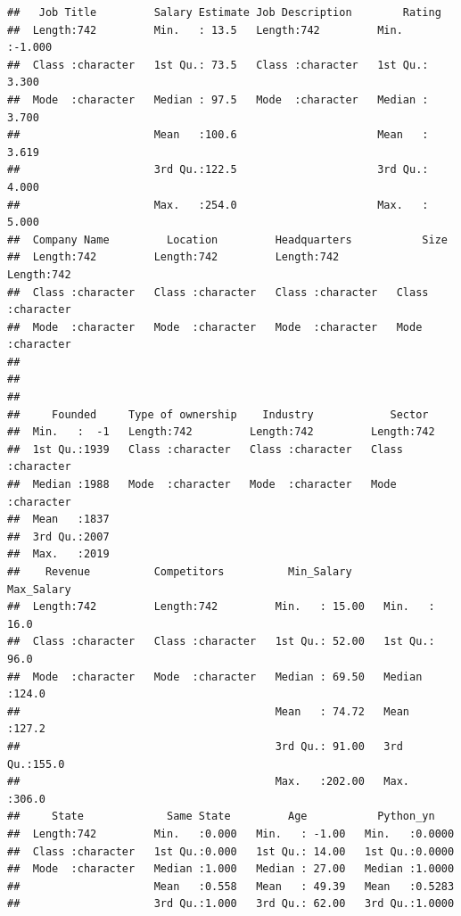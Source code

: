 \documentclass[
]{article}
\begin{document}
\begin{verbatim}
##   Job Title         Salary Estimate Job Description        Rating      
##  Length:742         Min.   : 13.5   Length:742         Min.   :-1.000  
##  Class :character   1st Qu.: 73.5   Class :character   1st Qu.: 3.300  
##  Mode  :character   Median : 97.5   Mode  :character   Median : 3.700  
##                     Mean   :100.6                      Mean   : 3.619  
##                     3rd Qu.:122.5                      3rd Qu.: 4.000  
##                     Max.   :254.0                      Max.   : 5.000  
##  Company Name         Location         Headquarters           Size          
##  Length:742         Length:742         Length:742         Length:742        
##  Class :character   Class :character   Class :character   Class :character  
##  Mode  :character   Mode  :character   Mode  :character   Mode  :character  
##                                                                             
##                                                                             
##                                                                             
##     Founded     Type of ownership    Industry            Sector         
##  Min.   :  -1   Length:742         Length:742         Length:742        
##  1st Qu.:1939   Class :character   Class :character   Class :character  
##  Median :1988   Mode  :character   Mode  :character   Mode  :character  
##  Mean   :1837                                                           
##  3rd Qu.:2007                                                           
##  Max.   :2019                                                           
##    Revenue          Competitors          Min_Salary       Max_Salary   
##  Length:742         Length:742         Min.   : 15.00   Min.   : 16.0  
##  Class :character   Class :character   1st Qu.: 52.00   1st Qu.: 96.0  
##  Mode  :character   Mode  :character   Median : 69.50   Median :124.0  
##                                        Mean   : 74.72   Mean   :127.2  
##                                        3rd Qu.: 91.00   3rd Qu.:155.0  
##                                        Max.   :202.00   Max.   :306.0  
##     State             Same State         Age           Python_yn     
##  Length:742         Min.   :0.000   Min.   : -1.00   Min.   :0.0000  
##  Class :character   1st Qu.:0.000   1st Qu.: 14.00   1st Qu.:0.0000  
##  Mode  :character   Median :1.000   Median : 27.00   Median :1.0000  
##                     Mean   :0.558   Mean   : 49.39   Mean   :0.5283  
##                     3rd Qu.:1.000   3rd Qu.: 62.00   3rd Qu.:1.0000  

\end{verbatim}
\end{document}
